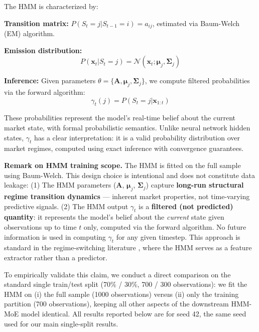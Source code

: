 \documentclass[3p,times]{elsarticle}
\begin{document}
The HMM is characterized by:

\textbf{Transition matrix:} $P(S_t = j | S_{t-1} = i) = a_{ij}$, estimated via Baum-Welch (EM) algorithm.

\textbf{Emission distribution:}
\begin{equation}
P(\mathbf{x}_t | S_t = j) = \mathcal{N}(\mathbf{x}_t; \boldsymbol{\mu}_j, \boldsymbol{\Sigma}_j)
\end{equation}

\textbf{Inference:} Given parameters $\theta = \{\mathbf{A}, \boldsymbol{\mu}_j, \boldsymbol{\Sigma}_j\}$, we compute filtered probabilities via the forward algorithm:
\begin{equation}
\gamma_t(j) = P(S_t = j | \mathbf{x}_{1:t})
\end{equation}

These probabilities represent the model's real-time belief about the current market state, with formal probabilistic semantics. Unlike neural network hidden states, $\gamma_t$ has a clear interpretation: it is a valid probability distribution over market regimes, computed using exact inference with convergence guarantees.

\textbf{Remark on HMM training scope.} The HMM is fitted on the full sample using Baum-Welch. This design choice is intentional and does not constitute data leakage: (1) The HMM parameters ($\mathbf{A}$, $\boldsymbol{\mu}_j$, $\boldsymbol{\Sigma}_j$) capture \textbf{long-run structural regime transition dynamics} — inherent market properties, not time-varying predictive signals. (2) The HMM output $\gamma_t$ is a \textbf{filtered (not predicted) quantity}: it represents the model's belief about the \emph{current} state given observations up to time $t$ only, computed via the forward algorithm. No future information is used in computing $\gamma_t$ for any given timestep. This approach is standard in the regime-switching literature \cite{hamilton1989}, where the HMM serves as a feature extractor rather than a predictor.

\vspace{0.5em}
To empirically validate this claim, we conduct a direct comparison on the standard single train/test split (70\% / 30\%, 700 / 300 observations): we fit the HMM on (i) the full sample (1000 observations) versus (ii) only the training partition (700 observations), keeping all other aspects of the downstream HMM-MoE model identical. All results reported below are for seed 42, the same seed used for our main single-split results.
\end{document}
